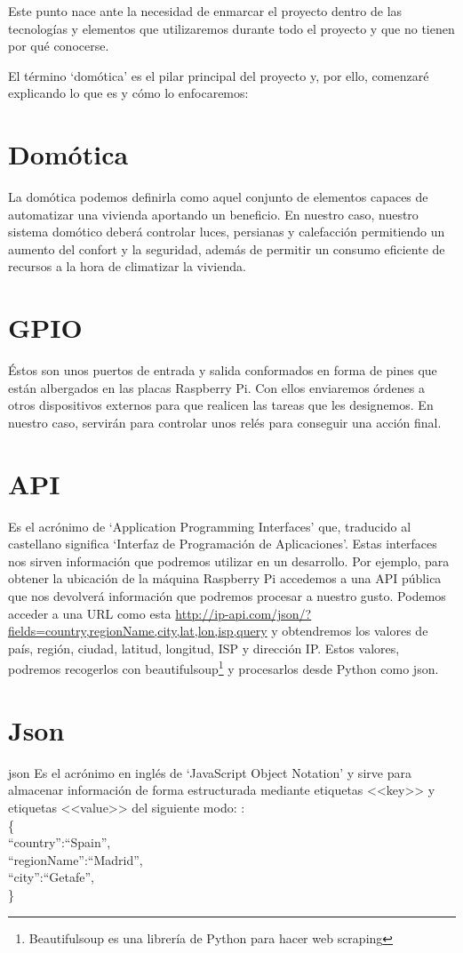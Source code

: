 

Este punto nace ante la necesidad de enmarcar el proyecto dentro de las tecnologías y elementos que utilizaremos durante todo el proyecto y que no tienen por qué conocerse.

El término ‘domótica’ es el pilar principal del proyecto y, por ello, comenzaré explicando lo que es y cómo lo enfocaremos:

\section{Domótica}
La domótica podemos definirla como aquel conjunto de elementos capaces de automatizar una vivienda aportando un beneficio.
En nuestro caso, nuestro sistema domótico deberá controlar luces, persianas y calefacción permitiendo un aumento del confort y la seguridad, además de permitir un consumo eficiente de recursos a la hora de climatizar la vivienda.

\section{GPIO}
Éstos son unos puertos de entrada y salida conformados en forma de pines que están albergados en las placas Raspberry Pi\cite{misc:RbPWeb}. Con ellos enviaremos órdenes a otros dispositivos externos para que realicen las tareas que les designemos. En nuestro caso, servirán para controlar unos relés para conseguir una acción final.

\section{API}
Es el acrónimo de ‘Application Programming Interfaces’ que, traducido al castellano significa ‘Interfaz de Programación de Aplicaciones’. Estas interfaces nos sirven información que podremos utilizar en un desarrollo.
Por ejemplo, para obtener la ubicación de la máquina Raspberry Pi accedemos a una API pública que nos devolverá información que podremos procesar a nuestro gusto.
Podemos acceder a una URL como esta  \url{http://ip-api.com/json/?fields=country,regionName,city,lat,lon,isp,query} y obtendremos los valores de país, región, ciudad, latitud, longitud, ISP y dirección IP.
Estos valores, podremos recogerlos con beautifulsoup\footnote{Beautifulsoup es una librería de Python para hacer web scraping} y procesarlos desde Python como json.

\section{Json}{json\cite{misc:Json}}
Es el acrónimo en inglés de ‘JavaScript Object Notation’ y sirve para almacenar información de forma estructurada mediante etiquetas <<key>> y etiquetas <<value>> del siguiente modo: : \\
\{\\``country'':``Spain'',\\ ``regionName'':``Madrid'',\\ ``city'':``Getafe'',\\\}\\


